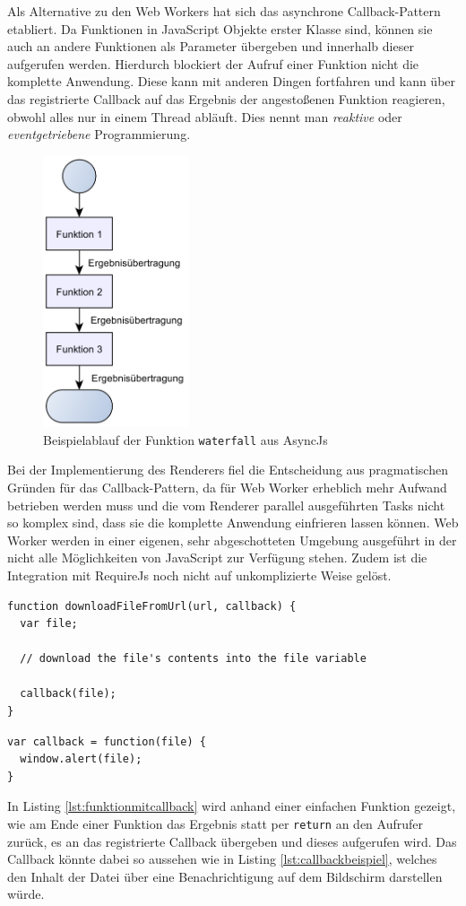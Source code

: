 Als Alternative zu den Web Workers hat sich das asynchrone Callback-Pattern etabliert. Da Funktionen in JavaScript Objekte erster Klasse sind, können sie auch an andere Funktionen als Parameter übergeben und innerhalb dieser aufgerufen werden. Hierdurch blockiert der Aufruf einer Funktion nicht die komplette Anwendung. Diese kann mit anderen Dingen fortfahren und kann über das registrierte Callback auf das Ergebnis der angestoßenen Funktion reagieren, obwohl alles nur in einem Thread abläuft. Dies nennt man \textit{reaktive} oder \textit{eventgetriebene} Programmierung.
\begin{figure}
\centering
\includegraphics[height=80mm]{bilder/asyncwaterfall.png}
\caption{Beispielablauf der Funktion \texttt{waterfall} aus AsyncJs}
\label{fig:asyncwaterfall}
\end{figure}
Bei der Implementierung des Renderers fiel die Entscheidung aus pragmatischen Gründen für das Callback-Pattern, da für Web Worker erheblich mehr Aufwand betrieben werden muss und die vom Renderer parallel ausgeführten Tasks nicht so komplex sind, dass sie die komplette Anwendung einfrieren lassen können. Web Worker werden in einer eigenen, sehr abgeschotteten Umgebung ausgeführt in der nicht alle Möglichkeiten von JavaScript zur Verfügung stehen. Zudem ist die Integration mit RequireJs noch nicht auf unkomplizierte Weise gelöst.
\lstset{language=JavaScript}
\begin{lstlisting}[caption={Beispiel für eine Methode mit einem Callback}, label={lst:funktionmitcallback}]
function downloadFileFromUrl(url, callback) {
  var file;

  // download the file's contents into the file variable

  callback(file);
}
\end{lstlisting}
\lstset{language=JavaScript}
\begin{lstlisting}[caption={Beispiel für ein mögliches Callback}, label={lst:callbackbeispiel}]
var callback = function(file) {
  window.alert(file);
}
\end{lstlisting}
In Listing \ref{lst:funktionmitcallback} wird anhand einer einfachen Funktion gezeigt, wie am Ende einer Funktion das Ergebnis statt per \texttt{return} an den Aufrufer zurück, es an das registrierte Callback übergeben und dieses aufgerufen wird. Das Callback könnte dabei so aussehen wie in Listing \ref{lst:callbackbeispiel}, welches den Inhalt der Datei über eine Benachrichtigung auf dem Bildschirm darstellen würde.

